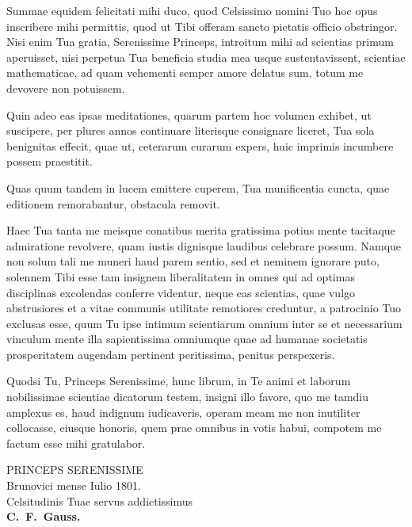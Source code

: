 \documentclass[12pt,a4paper]{article}
\theoremstyle{plain}
\theoremstyle{definition}
\theoremstyle{remark}
\begin{document}
\vspace{0.3cm}
\noindent
Summae equidem felicitati mihi duco, quod Celsissimo nomini Tuo hoc opus inscribere mihi permittis, quod ut Tibi offeram sancto pietatis officio obstringor. Nisi enim Tua gratia, Serenissime Princeps, introitum mihi ad scientias primum aperuisset, nisi perpetua Tua beneficia studia mea usque sustentavissent, scientiae mathematicae, ad quam vehementi semper amore delatus sum, totum me devovere non potuissem.

Quin adeo eas ipsas meditationes, quarum partem hoc volumen exhibet, ut suscipere, per plures annos continuare literisque consignare liceret, Tua sola benignitas effecit, quae ut, ceterarum curarum expers, huic imprimis incumbere possem praestitit.

Quas quum tandem in lucem emittere cuperem, Tua munificentia cuncta, quae editionem remorabantur, obstacula removit.

Haec Tua tanta me meisque conatibus merita gratissima potius mente tacitaque admiratione revolvere, quam iustis dignisque laudibus celebrare possum. Namque non solum tali me muneri haud parem sentio, sed et neminem ignorare puto, solennem Tibi esse tam insignem liberalitatem in omnes qui ad optimas disciplinas excolendas conferre videntur, neque eas scientias, quae vulgo abstrusiores et a vitae communis utilitate remotiores creduntur, a patrocinio Tuo exclusas esse, quum Tu ipse intimum scientiarum omnium inter se et necessarium vinculum mente illa sapientissima omniumque quae ad humanae societatis prosperitatem augendam pertinent peritissima, penitus perspexeris.

Quodsi Tu, Princeps Serenissime, hunc librum, in Te animi et laborum nobilissimae scientiae dicatorum testem, insigni illo favore, quo me tamdiu amplexus es, haud indignum iudicaveris, operam meam me non inutiliter collocasse, eiusque honoris, quem prae omnibus in votis habui, compotem me factum esse mihi gratulabor.

\vspace{1cm}
\begin{flushright}
\begin{minipage}{0.6\textwidth}
\begin{flushright}
PRINCEPS SERENISSIME\\[0.3cm]
Brunovici mense Iulio 1801.\\[0.5cm]
Celsitudinis Tuae servus addictissimus\\[0.3cm]
{\bfseries C.~F.~Gauss.}
\end{flushright}
\end{minipage}
\end{flushright}
\clearpage
\end{document}

